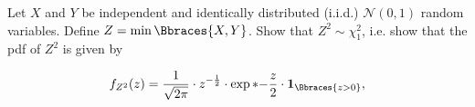 
\begin{exercise}

Let $X$ and $Y$ be independent and identically distributed (i.i.d.) $\mathcal N(0, 1)$ random variables.
Define $Z = \min \Bbraces{X, Y}$.
Show that $Z^2 \sim \chi_1^2$, i.e. show that the pdf of $Z^2$ is given by

\begin{align*}
    f_{Z^2}(z)
    =
    \frac{1}{\sqrt{2 \pi}} \cdot z^{-\frac{1}{2}} \cdot \exp*{-\frac{z}{2}} \cdot \mathbf 1_\Bbraces{z > 0},
\end{align*}

\end{exercise}



